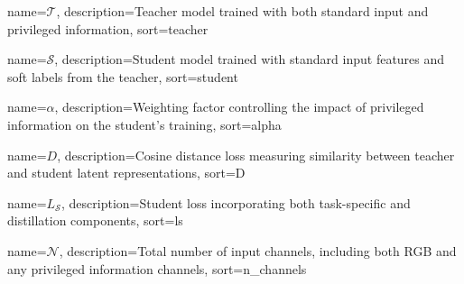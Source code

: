 {
    name=\(\mathcal{T}\),
    description={Teacher model trained with both standard input and privileged information},
    sort=teacher
}

{
    name=\(\mathcal{S}\),
    description={Student model trained with standard input features and soft labels from the teacher},
    sort=student
}

{
    name=\(\alpha\),
    description={Weighting factor controlling the impact of privileged information on the student's training},
    sort=alpha
}

{
    name=\(D\),
    description={Cosine distance loss measuring similarity between teacher and student latent representations},
    sort=D
}

{
    name=\(L_{\mathcal{S}}\),
    description={Student loss incorporating both task-specific and distillation components},
    sort=ls
}

{
    name=\(\mathcal{N}\),
    description={Total number of input channels, including both RGB and any privileged information channels},
    sort=n_channels
}




